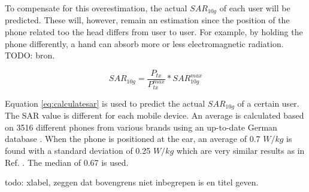 To compensate for this overestimation, the actual $SAR_{10g}$ of each user will be predicted. These will, however, remain an estimation since the position of the phone related too the head differs from user to user. For example, by holding the phone differently, a hand can absorb more or less electromagnetic radiation. TODO: bron.

\begin{equation}
{SAR}_{10g} = \frac{P_{tx}}{P^{max}_{tx}} * {SAR}^{max}_{10g}
\label{eq:calculatesar}
\end{equation}

Equation \ref{eq:calculatesar} is used to predict the actual $SAR_{10g}$  of a certain user. The \gls{SAR} value is different for each mobile device. An average is calculated based on 3516 different phones from various brands using an up-to-date German database \cite{SARDatabase}.
When the phone is positioned at the ear, an average of 0.7 $W/kg$ is found with a standard deviation of 0.25 $W/kg$ which are very similar results as in Ref. \cite{j10.1.1_gati2010duality}. The median of 0.67 is used.



todo: xlabel, zeggen dat bovengrens niet inbegrepen is en titel geven.


